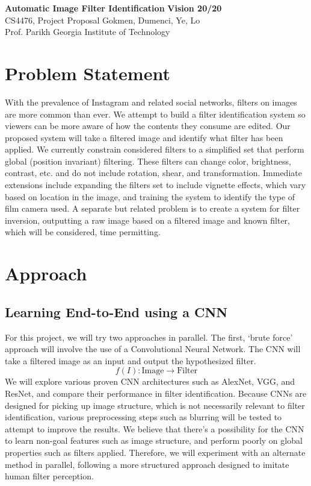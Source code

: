 \documentclass[a4paper, 11pt]{article}
\begin{document}
\noindent
\large\textbf{Automatic Image Filter Identification} \hfill \textbf{Vision 20/20} \\
\normalsize CS4476, Project Proposal \hfill Gokmen, Dumenci, Ye, Lo \\
Prof. Parikh \hfill Georgia Institute of Technology

\section*{Problem Statement}
With the prevalence of Instagram and related social networks, filters on images are more common than ever. We attempt to build a filter identification system so viewers can be more aware of how the contents they consume are edited. Our proposed system will take a filtered image and identify what filter has been applied. We currently constrain considered filters to a simplified set that perform global (position invariant) filtering. These filters can change color, brightness, contrast, etc. and do not include rotation, shear, and transformation. Immediate extensions include expanding the filters set to include vignette effects, which vary based on location in the image, and training the system to identify the type of film camera used. A separate but related problem is to create a system for filter inversion, outputting a raw image based on a filtered image and known filter, which will be considered, time permitting.


  

\section*{Approach}

\subsection*{Learning End-to-End using a CNN}
For this project, we will try two approaches in parallel. The first, `brute force' approach will involve the use of a Convolutional Neural Network. The CNN will take a filtered image as an input and output the hypothesized filter.
$$f(I) : \text{Image} \to \text{Filter}$$
We will explore various proven CNN architectures such as AlexNet, VGG, and ResNet, and compare their performance in filter identification. Because CNNs are designed for picking up image structure, which is not necessarily relevant to filter identification, various preprocessing steps such as blurring will be tested to attempt to improve the results. We believe that there's a possibility for the CNN to learn non-goal features such as image structure, and perform poorly on global properties such as filters applied. Therefore, we will experiment with an alternate method in parallel, following a more structured approach designed to imitate human filter perception.
\end{document}

